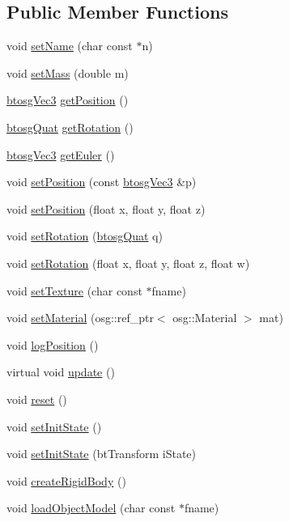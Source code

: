 \subsection*{Public Member Functions}
\begin{DoxyCompactItemize}
\item 
void \hyperlink{classbtosgObject_ab06a1b3f357209214c6440cd5746523e}{set\+Name} (char const $\ast$n)
\item 
void \hyperlink{classbtosgObject_a91da93c82d48b86192f0cbb16054fe57}{set\+Mass} (double m)
\item 
\hyperlink{classbtosgVec3}{btosg\+Vec3} \hyperlink{classbtosgObject_a3dadd5da8f2a312e44a039446b93d4cd}{get\+Position} ()
\item 
\hyperlink{classbtosgQuat}{btosg\+Quat} \hyperlink{classbtosgObject_a3b825999ad3a51bde743d4085ff19dae}{get\+Rotation} ()
\item 
\hyperlink{classbtosgVec3}{btosg\+Vec3} \hyperlink{classbtosgObject_a2019ec63bde02b72600450c7c985e77a}{get\+Euler} ()
\item 
void \hyperlink{classbtosgObject_ace6b51040b7ddce90818174200cc6074}{set\+Position} (const \hyperlink{classbtosgVec3}{btosg\+Vec3} \&p)
\item 
void \hyperlink{classbtosgObject_adb9f2cff0faf66dc252cd7c97b11ac84}{set\+Position} (float x, float y, float z)
\item 
void \hyperlink{classbtosgObject_a6365748d5506bb9da31907c9988071fa}{set\+Rotation} (\hyperlink{classbtosgQuat}{btosg\+Quat} q)
\item 
void \hyperlink{classbtosgObject_a4d21ca59b944fd26644db35d3e9ba67a}{set\+Rotation} (float x, float y, float z, float w)
\item 
void \hyperlink{classbtosgObject_aff54acbc7c66811efb0cf2838107a241}{set\+Texture} (char const $\ast$fname)
\item 
void \hyperlink{classbtosgObject_a6ab7b9e0553dab398b980637788b56a8}{set\+Material} (osg\+::ref\+\_\+ptr$<$ osg\+::\+Material $>$ mat)
\item 
void \hyperlink{classbtosgObject_acfd70fa6477c80fd7f29ad7ab9f4f067}{log\+Position} ()
\item 
virtual void \hyperlink{classbtosgObject_a342917817dfde62554f83da8e0d5110b}{update} ()
\item 
void \hyperlink{classbtosgObject_a93983f9180dd0672f8779cf2baa78580}{reset} ()
\item 
void \hyperlink{classbtosgObject_ad1508a0ce28cfac83e5f0ff6245f91b5}{set\+Init\+State} ()
\item 
void \hyperlink{classbtosgObject_a6ceb08e59ee95acaaef389ee198d2b56}{set\+Init\+State} (bt\+Transform i\+State)
\item 
void \hyperlink{classbtosgObject_a029dbe9134fa94e7355799f67fb2cd6d}{create\+Rigid\+Body} ()
\item 
void \hyperlink{classbtosgObject_a91838b8235579da178fcc06e6d3d47f3}{load\+Object\+Model} (char const $\ast$fname)
\end{DoxyCompactItemize}
